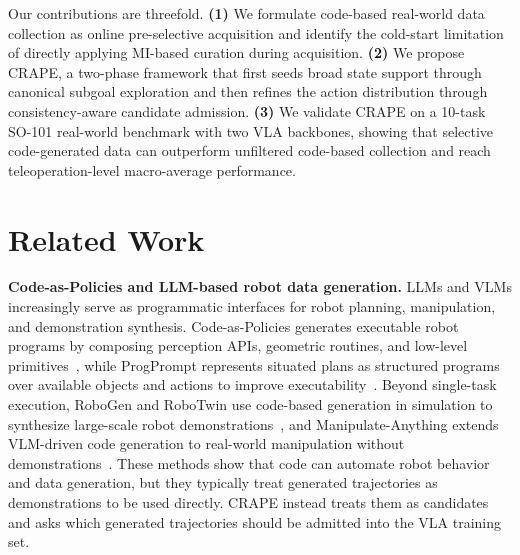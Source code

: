 \documentclass{article}
\begin{document}
    Our contributions are threefold. 
    \textbf{(1)} We formulate code-based real-world data collection as online pre-selective acquisition and identify the cold-start limitation of directly applying MI-based curation during acquisition.
    \textbf{(2)} We propose CRAPE, a two-phase framework that first seeds broad state support through canonical subgoal exploration and then refines the action distribution through consistency-aware candidate admission.
    \textbf{(3)} We validate CRAPE on a 10-task SO-101 real-world benchmark with two VLA backbones, showing that selective code-generated data can outperform unfiltered code-based collection and reach teleoperation-level macro-average performance.


\section{Related Work}
\textbf{Code-as-Policies and LLM-based robot data generation.}
LLMs and VLMs increasingly serve as programmatic interfaces for robot planning, manipulation, and demonstration synthesis. 
Code-as-Policies generates executable robot programs by composing perception APIs, geometric routines, and low-level primitives~\citep{liang2023code}, while ProgPrompt represents situated plans as structured programs over available objects and actions to improve executability~\citep{singh2023progprompt}. 
Beyond single-task execution, RoboGen and RoboTwin use code-based generation in simulation to synthesize large-scale robot demonstrations~\citep{wang2023robogen,chen2025robotwin}, and Manipulate-Anything extends VLM-driven code generation to real-world manipulation without demonstrations~\citep{duan2024manipulate}. 
These methods show that code can automate robot behavior and data generation, but they typically treat generated trajectories as demonstrations to be used directly. 
CRAPE instead treats them as candidates and asks which generated trajectories should be admitted into the VLA training set.
\end{document}
